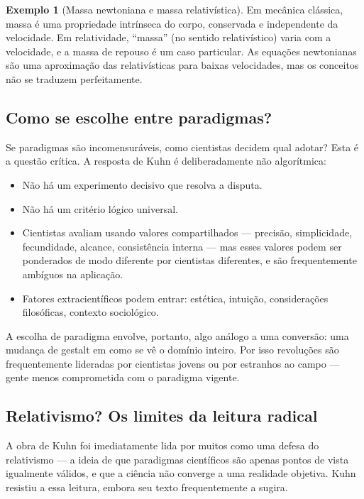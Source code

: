 \documentclass[9pt,a4paper]{extarticle}
\newcommand{\impt}[1]{\textcolor{important}{#1}}
\theoremstyle{definition}
\newtheorem{example}{Exemplo}[section]
\begin{document}
\begin{example}[Massa newtoniana e massa relativística]
Em mecânica clássica, massa é uma propriedade intrínseca do corpo, conservada e independente da velocidade. Em relatividade, ``massa'' (no sentido relativístico) varia com a velocidade, e a massa de repouso é um caso particular. As equações newtonianas são uma aproximação das relativísticas para baixas velocidades, mas \impt{os conceitos não se traduzem perfeitamente}.
\end{example}

\subsection{Como se escolhe entre paradigmas?}

Se paradigmas são incomensuráveis, como cientistas decidem qual adotar? Esta é a questão crítica. A resposta de Kuhn é deliberadamente \impt{não algorítmica}:

\begin{itemize}
  \item Não há um experimento decisivo que resolva a disputa.
  \item Não há um critério lógico universal.
  \item Cientistas avaliam usando \impt{valores compartilhados} --- precisão, simplicidade, fecundidade, alcance, consistência interna --- mas esses valores podem ser \impt{ponderados de modo diferente} por cientistas diferentes, e são frequentemente \impt{ambíguos} na aplicação.
  \item Fatores \impt{extracientíficos} podem entrar: estética, intuição, considerações filosóficas, contexto sociológico.
\end{itemize}

A escolha de paradigma envolve, portanto, algo análogo a uma \impt{conversão}: uma mudança de gestalt em como se vê o domínio inteiro. Por isso revoluções são frequentemente lideradas por \impt{cientistas jovens} ou por estranhos ao campo --- gente menos comprometida com o paradigma vigente.

\subsection{Relativismo? Os limites da leitura radical}

A obra de Kuhn foi imediatamente lida por muitos como uma defesa do \impt{relativismo} --- a ideia de que paradigmas científicos são apenas pontos de vista igualmente válidos, e que a ciência não converge a uma realidade objetiva. Kuhn resistiu a essa leitura, embora seu texto frequentemente a sugira.
\end{document}
